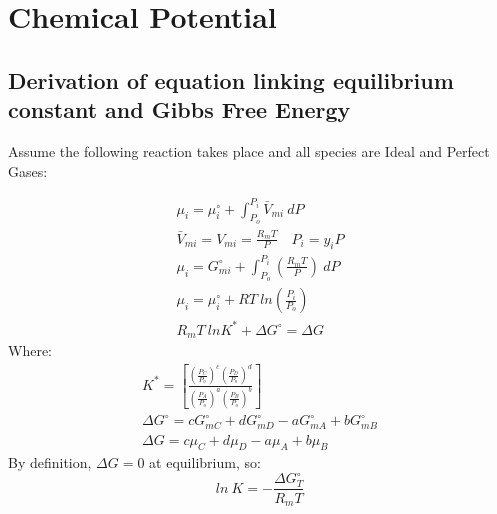 \documentclass[10pt, oneside, twocolumn]{article}
\numberwithin{equation}{section}
\begin{document}
	\section{Chemical Potential}
		\subsection{Derivation of equation linking equilibrium constant and Gibbs Free Energy}
			Assume the following reaction takes place and all species are Ideal and Perfect Gases:\\
			\par
			\begin{gather}
			\mu_i=\mu_i^\circ+\int_{P_o}^{P_i}\bar{V}_{mi} \ dP\\
			\bar{V}_{mi}=V_{mi}=\frac{R_mT}{P} \quad P_i=y_iP\\
			\mu_i=G^\circ_{mi}+\int_{P_o}^{P_i}\left(\frac{R_mT}{P}\right) \ dP\\
			\mu_i=\mu_i^\circ+RT \ ln \left(\frac{P_i}{P_o}\right)\\
			R_mT \ ln K^*+\Delta G^\circ=\Delta G
			\end{gather}
			Where:
			\begin{gather}
			K^*=\left[\frac{{\left(\frac{P_C}{P_o}\right)}^c{\left(\frac{P_D}{P_o}\right)}^d}{{\left(\frac{P_A}{P_o}\right)}^a{\left(\frac{P_B}{P_o}\right)}^b}\right]\\
			\Delta G^\circ=cG^\circ_{mC}+dG^\circ_{mD}-aG^\circ_{mA}+bG^\circ_{mB}\\
			\Delta G=c\mu_C+d\mu_D-a\mu_A+b\mu_B
			\end{gather}
			By definition, $\Delta G=0$ at equilibrium, so:
			\begin{equation}
			ln \ K=-\frac{\Delta G^\circ_T}{R_mT} \label{eq:chempot}
			\end{equation}
\end{document}
